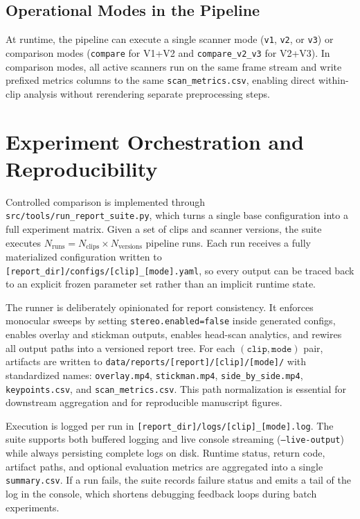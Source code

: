\documentclass[11pt,a4paper]{article}
\begin{document}
\subsection{Operational Modes in the Pipeline}
At runtime, the pipeline can execute a single scanner mode (\texttt{v1}, \texttt{v2}, or \texttt{v3}) or comparison modes (\texttt{compare} for V1+V2 and \texttt{compare\_v2\_v3} for V2+V3). In comparison modes, all active scanners run on the same frame stream and write prefixed metrics columns to the same \texttt{scan\_metrics.csv}, enabling direct within-clip analysis without rerendering separate preprocessing steps.

\section{Experiment Orchestration and Reproducibility}
Controlled comparison is implemented through \texttt{src/tools/run\_report\_suite.py}, which turns a single base configuration into a full experiment matrix. Given a set of clips and scanner versions, the suite executes \(N_{\text{runs}} = N_{\text{clips}} \times N_{\text{versions}}\) pipeline runs. Each run receives a fully materialized configuration written to \texttt{[report\_dir]/configs/[clip]\_[mode].yaml}, so every output can be traced back to an explicit frozen parameter set rather than an implicit runtime state.

The runner is deliberately opinionated for report consistency. It enforces monocular sweeps by setting \texttt{stereo.enabled=false} inside generated configs, enables overlay and stickman outputs, enables head-scan analytics, and rewires all output paths into a versioned report tree. For each \((\texttt{clip},\texttt{mode})\) pair, artifacts are written to \texttt{data/reports/[report]/[clip]/[mode]/} with standardized names: \texttt{overlay.mp4}, \texttt{stickman.mp4}, \texttt{side\_by\_side.mp4}, \texttt{keypoints.csv}, and \texttt{scan\_metrics.csv}. This path normalization is essential for downstream aggregation and for reproducible manuscript figures.

Execution is logged per run in \texttt{[report\_dir]/logs/[clip]\_[mode].log}. The suite supports both buffered logging and live console streaming (\texttt{--live-output}) while always persisting complete logs on disk. Runtime status, return code, artifact paths, and optional evaluation metrics are aggregated into a single \texttt{summary.csv}. If a run fails, the suite records failure status and emits a tail of the log in the console, which shortens debugging feedback loops during batch experiments.
\end{document}
